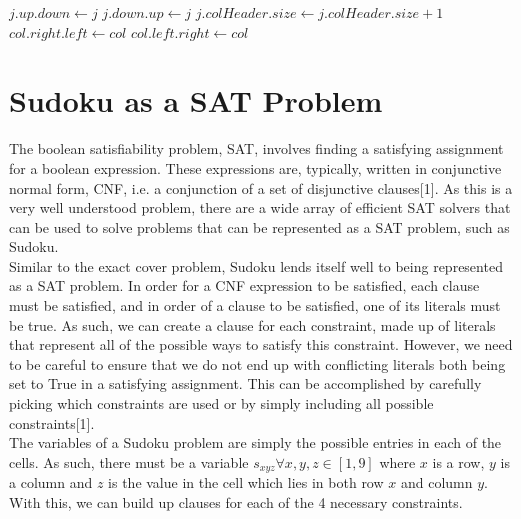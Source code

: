 \documentclass[12pt]{article}
\newcounter{row}
\newcounter{col}
\begin{document}
\begin{algorithm}[!ht]
\label{uncover}
\begin{algorithmic}
\State $j.up.down \gets j$
\State $j.down.up \gets j$
\State $j.colHeader.size \gets j.colHeader.size + 1$
\EndFor
\EndFor
\State $col.right.left \gets col$
\State $col.left.right \gets col$
\EndProcedure
\end{algorithmic}
\end{algorithm}

\section{Sudoku as a SAT Problem}
The boolean satisfiability problem, SAT, involves finding a satisfying assignment for a boolean expression. These expressions are, typically, written in conjunctive normal form, CNF, i.e. a conjunction of a set of disjunctive clauses[1]. As this is a very well understood problem, there are a wide array of efficient SAT solvers that can be used to solve problems that can be represented as a SAT problem, such as Sudoku. \\

Similar to the exact cover problem, Sudoku lends itself well to being represented as a SAT problem. In order for a CNF expression to be satisfied, each clause must be satisfied, and in order of a clause to be satisfied, one of its literals must be true. As such, we can create a clause for each constraint, made up of literals that represent all of the possible ways to satisfy this constraint. However, we need to be careful to ensure that we do not end up with conflicting literals both being set to True in a satisfying assignment. This can be accomplished by carefully picking which constraints are used or by simply including all possible constraints[1]. \\

The variables of a Sudoku problem are simply the possible entries in each of the cells. As such, there must be a variable $s_{xyz} \forall x,y,z \in [1,9]$ where $x$ is a row, $y$ is a column and $z$ is the value in the cell which lies in both row $x$ and column $y$. With this, we can build up clauses for each of the 4 necessary constraints. \\
\end{document}
